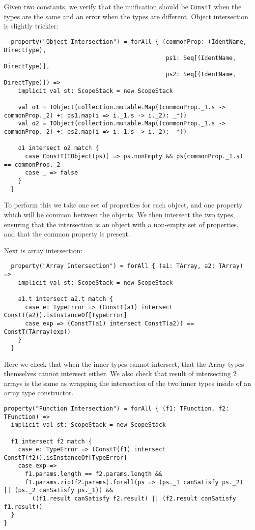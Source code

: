 \documentclass[british, twoside, openright]{bhamthesis}
\theoremstyle{definition}
\begin{document}
      Given two constants, we verify that the unification should be \texttt{ConstT} when the types are the same and an error when the types are different. Object intersection is slightly trickier:
      \begin{lstlisting}
  property("Object Intersection") = forAll { (commonProp: (IdentName, DirectType),
                                              ps1: Seq[(IdentName, DirectType)],
                                              ps2: Seq[(IdentName, DirectType)]) =>
    implicit val st: ScopeStack = new ScopeStack

    val o1 = TObject(collection.mutable.Map((commonProp._1.s -> commonProp._2) +: ps1.map(i => i._1.s -> i._2): _*))
    val o2 = TObject(collection.mutable.Map((commonProp._1.s -> commonProp._2) +: ps2.map(i => i._1.s -> i._2): _*))

    o1 intersect o2 match {
      case ConstT(TObject(ps)) => ps.nonEmpty && ps(commonProp._1.s) == commonProp._2
      case _ => false
    }
  }
    \end{lstlisting}

      To perform this we take one set of properties for each object, and one property which will be common between the objects. We then intersect the two types, ensuring that the intersection is an object with a non-empty set of properties, and that the common property is present.

      Next is array intersection:
      \begin{lstlisting}
  property("Array Intersection") = forAll { (a1: TArray, a2: TArray) =>
    implicit val st: ScopeStack = new ScopeStack

    a1.t intersect a2.t match {
      case e: TypeError => (ConstT(a1) intersect ConstT(a2)).isInstanceOf[TypeError]
      case exp => (ConstT(a1) intersect ConstT(a2)) == ConstT(TArray(exp))
    }
  }
      \end{lstlisting}

      Here we check that when the inner types cannot intersect, that the Array types themselves cannot intersect either. We also check that result of intersecting 2 arrays is the same as wrapping the intersection of the two inner types inside of an array type constructor.

      \begin{lstlisting}
property("Function Intersection") = forAll { (f1: TFunction, f2: TFunction) =>
  implicit val st: ScopeStack = new ScopeStack

  f1 intersect f2 match {
    case e: TypeError => (ConstT(f1) intersect ConstT(f2)).isInstanceOf[TypeError]
    case exp =>
      f1.params.length == f2.params.length &&
      f1.params.zip(f2.params).forall(ps => (ps._1 canSatisfy ps._2) || (ps._2 canSatisfy ps._1)) &&
        ((f1.result canSatisfy f2.result) || (f2.result canSatisfy f1.result))
  }
}
      \end{lstlisting}
\end{document}

